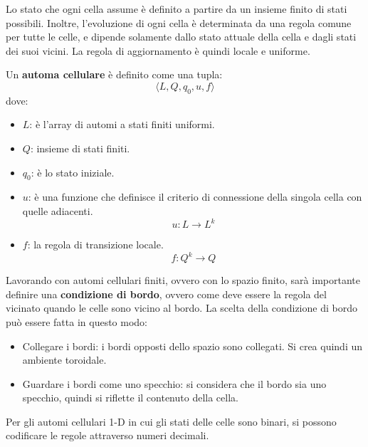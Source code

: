 Lo stato che ogni cella assume è definito a partire da un insieme finito di stati
possibili. Inoltre, l'evoluzione di ogni cella è determinata da una regola comune
per tutte le celle, e dipende solamente dallo stato attuale della cella e dagli
stati dei suoi vicini. La regola di aggiornamento è quindi locale e uniforme.
\begin{definizione}
    Un \textbf{automa cellulare} è definito come una tupla:
    \begin{equation*}
        \langle L, Q, q_0, u,f\rangle
    \end{equation*}
    dove:
    \begin{itemize}
        \item $L$: è l'array di automi a stati finiti uniformi.
        \item $Q$: insieme di stati finiti.
        \item $q_0$: è lo stato iniziale.
        \item $u$: è una funzione che definisce il criterio di connessione della
              singola cella con quelle adiacenti.
              \begin{equation*}
                  u: L \rightarrow L^{k}
              \end{equation*}
        \item $f$: la regola di transizione locale.
              \begin{equation*}
                  f: Q^{k} \rightarrow Q
              \end{equation*}
    \end{itemize}
\end{definizione}
Lavorando con automi cellulari finiti, ovvero con lo spazio finito, sarà
importante definire una \textbf{condizione di bordo}, ovvero come deve essere la
regola del vicinato quando le celle sono vicino al bordo. La scelta della
condizione di bordo può essere fatta in questo modo:
\begin{itemize}
    \item Collegare i bordi: i bordi opposti dello spazio sono collegati. Si crea
          quindi un ambiente toroidale.
    \item Guardare i bordi come uno specchio: si considera che il bordo sia uno
          specchio, quindi si riflette il contenuto della cella.
\end{itemize}
Per gli automi cellulari 1-D in cui gli stati delle celle sono binari, si possono
codificare le regole attraverso numeri decimali.


